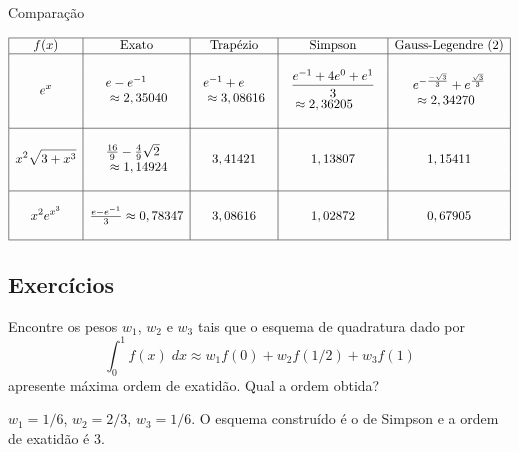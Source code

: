 \begin{ex} Comparação
  \begin{small}
$$
\begin{array}{|c|c|c|c|c|}
\hline
f(x)&\text{Exato}&\text{Trapézio} &\text{Simpson} & \text{Gauss-Legendre (2)}\\
\hline
&&&&\\
\displaystyle e^{x}&\displaystyle \begin{array}{l}e-e^{-1}\\~\approx 2,35040\end{array}  & \displaystyle \begin{array}{l}e^{-1}+e \\ ~\approx 3,08616 \end{array}& \begin{array}{l}\displaystyle \frac{e^{-1}+4e^{0}+e^{1}}{3}\\ ~\approx  2,36205\end{array} & \begin{array}{l}\displaystyle e^{-\frac{-\sqrt{3}}{3}}+e^{\frac{\sqrt{3}}{3}}\\ ~\approx   2,34270\end{array}\\
&&&&\\
 \hline
&&&&\\
\displaystyle x^2\sqrt{3+x^3}& \begin{array}{l}\frac{16}{9}-\frac{4}{9}\sqrt{2}\\~\approx 1,14924\end{array} & 3,41421  & 1,13807 & 1,15411\\
&&&&\\
 \hline
&&&&\\
  \displaystyle x^2e^{x^3}&\frac{e-e^{-1}}{3}\approx 0,78347 & 3,08616     & 1,02872  & 0,67905\\
&&&&\\
 \hline
    \end{array}
$$
  \end{small}
\end{ex}

\subsection*{Exercícios}

\begin{exer}
Encontre os pesos $w_1$, $w_2$ e $w_3$ tais que o esquema de quadratura dado por
$$\int_{0}^{1}f(x)\;dx\approx w_1f(0)+w_2f(1/2)+w_3 f(1)$$
apresente máxima ordem de exatidão. Qual a ordem obtida?
\end{exer}
\begin{resp}

 $w_1=1/6$, $w_2=2/3$, $w_3=1/6$. O esquema construído é o de Simpson e a ordem de exatidão é 3.

\end{resp}

